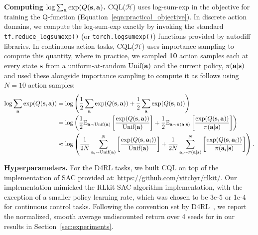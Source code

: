 \textbf{Computing $\log \sum_{\mathbf{a}} \exp(Q(\mathbf{s}, \mathbf{a})$.} CQL($\mathcal{H}$) uses log-sum-exp in the objective for training the Q-function (Equation~\ref{eqn:practical_objective}). In discrete action domains, we compute the log-sum-exp exactly by invoking the standard \texttt{tf.reduce\_logsumexp()} (or \texttt{torch.logsumexp()}) functions provided by autodiff libraries. In continuous action tasks, CQL($\mathcal{H}$) uses importance sampling to compute this quantity, where in practice, we sampled \textbf{10} action samples each at every state $\mathbf{s}$ from a uniform-at-random $\text{Unif}(\mathbf{a})$ and the current policy, $\pi(\mathbf{a}|\mathbf{s})$ and used these alongside importance sampling to compute it as follows using $N = 10$ action samples:
\begin{align*}
    \log \sum_{\mathbf{a}}\exp (Q(\mathbf{s}, \mathbf{a})) &= \log \left( \frac{1}{2}\sum_{\mathbf{a}} \exp (Q(\mathbf{s}, \mathbf{a})) + \frac{1}{2} \sum_{\mathbf{a}} \exp (Q(\mathbf{s}, \mathbf{a})) \right) \\
    &= \log \left( \frac{1}{2} \mathbb{E}_{\mathbf{a} \sim \text{Unif}(\mathbf{a})}\left[ \frac{\exp (Q(\mathbf{s}, \mathbf{a}))}{\text{Unif}(\mathbf{a})}\right] + \frac{1}{2} \mathbb{E}_{\mathbf{a} \sim \pi(\mathbf{a}|\mathbf{s})}\left[ \frac{\exp (Q(\mathbf{s}, \mathbf{a}))}{\pi(\mathbf{a}|\mathbf{s})}\right] \right) \\
    &\approx \log \left( \frac{1}{2N} \sum_{\mathbf{a}_i \sim \text{Unif}(\mathbf{a})}^N \left[ \frac{\exp (Q(\mathbf{s}, \mathbf{a}_i))}{\text{Unif}(\mathbf{a})}\right] + \frac{1}{2N} \sum_{\mathbf{a}_i \sim \pi(\mathbf{a}|\mathbf{s})}^N \left[ \frac{\exp (Q(\mathbf{s}, \mathbf{a}_i))}{\pi(\mathbf{a}_i|\mathbf{s})}\right] \right).
\end{align*}

\textbf{Hyperparameters.} For the D4RL tasks, we built CQL on top of the implementation of SAC provided at: \url{https://github.com/vitchyr/rlkit/}. Our implementation mimicked the RLkit SAC algorithm implementation, with the exception of a smaller policy learning rate, which was chosen to be 3e-5 or 1e-4 for continuous control tasks. Following the convention set by D4RL~\citep{d4rl}, we report the normalized, smooth average undiscounted return over 4 seeds for in our results in Section~\ref{sec:experiments}.

